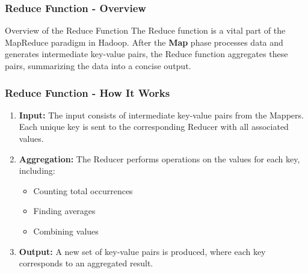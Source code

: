 \documentclass[aspectratio=169]{beamer}
\begin{document}
\begin{frame}[fragile]
    \frametitle{Reduce Function - Overview}
    \begin{block}{Overview of the Reduce Function}
        The Reduce function is a vital part of the MapReduce paradigm in Hadoop. 
        After the \textbf{Map} phase processes data and generates intermediate key-value pairs, 
        the Reduce function aggregates these pairs, summarizing the data into a concise output.
    \end{block}
\end{frame}

\begin{frame}[fragile]
    \frametitle{Reduce Function - How It Works}
    \begin{enumerate}
        \item \textbf{Input:} 
        The input consists of intermediate key-value pairs from the Mappers. Each unique key is sent to the corresponding Reducer with all associated values.
        
        \item \textbf{Aggregation:} 
        The Reducer performs operations on the values for each key, including:
        \begin{itemize}
            \item Counting total occurrences
            \item Finding averages
            \item Combining values
        \end{itemize}

        \item \textbf{Output:} 
        A new set of key-value pairs is produced, where each key corresponds to an aggregated result.
    \end{enumerate}
\end{frame}
\end{document}
